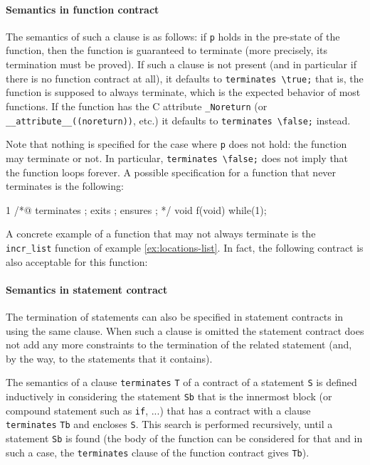 \paragraph{Semantics in function contract}
The semantics of such a clause is as follows: if \lstinline|p| holds in the
pre-state of the function, then the function is guaranteed to terminate (more
precisely, its termination must be proved). If such a clause is not present (and
in particular if there is no function contract at all), it defaults to
\lstinline|terminates \true;| that is, the function is supposed to always
terminate, which is the expected behavior of most functions. If the function has
the C attribute \lstinline|_Noreturn|
(or \lstinline|__attribute__((noreturn))|, etc.) it defaults to
\lstinline|terminates \false;| instead.

Note that nothing is specified for the case where \lstinline|p| does not hold:
the function may terminate or not. In particular,
\lstinline|terminates \false;| does not imply that the function loops
forever. A possible specification for a function that never terminates
is the following:
\begin{listing}{1}
/*@
  terminates \false;
  exits \false;
  ensures \false;
*/
void f(void) { while(1); }
\end{listing}

\begin{example}
  A concrete example of a function that may not always terminate is
  the \lstinline|incr_list| function of example \ref{ex:locations-list}. In
  fact, the following contract is also acceptable for this function:
\end{example}

\paragraph{Semantics in statement contract}
The termination of statements can also be specified in statement contracts in using
the same clause.
When such a clause is omitted the statement contract does not add any more constraints
to the termination of the related statement (and, by the way, to the statements that it contains).

The semantics of a clause \lstinline|terminates| \lstinline|T| of a contract of
a statement \lstinline|S| is defined inductively in considering the
statement \lstinline|Sb| that is the innermost block (or compound statement such
as \lstinline|if|, ...) that has a contract with a clause \lstinline|terminates|
\lstinline|Tb| and encloses \lstinline|S|.
This search is performed recursively, until a statement \lstinline|Sb| is found
(the body of the function can be considered for that and in such a case, the
\lstinline|terminates| clause of the function contract gives \lstinline|Tb|).

